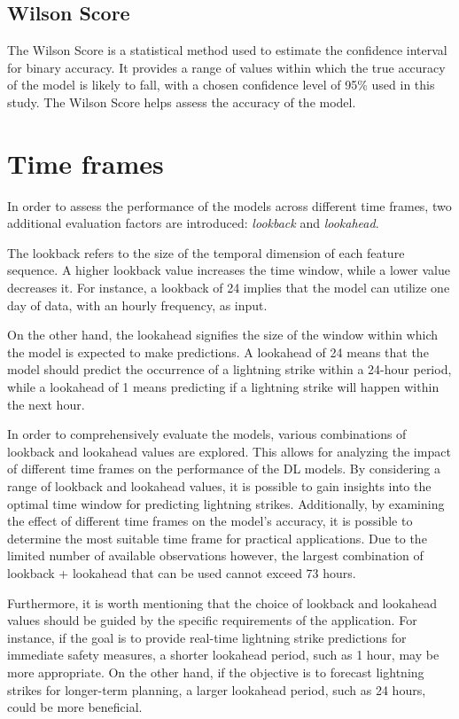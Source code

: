 \subsection{Wilson Score}

The Wilson Score is a statistical method used to estimate the confidence interval for binary accuracy. It provides a range of values within which the true accuracy of the model is likely to fall, with a chosen confidence level of 95\% used in this study. The Wilson Score helps assess the accuracy of the model.

\section{Time frames}

In order to assess the performance of the models across different time frames, two additional evaluation factors are introduced: \textit{lookback} and \textit{lookahead}.

The lookback refers to the size of the temporal dimension of each feature sequence. A higher lookback value increases the time window, while a lower value decreases it. For instance, a lookback of 24 implies that the model can utilize one day of data, with an hourly frequency, as input. 

On the other hand, the lookahead signifies the size of the window within which the model is expected to make predictions. A lookahead of 24 means that the model should predict the occurrence of a lightning strike within a 24-hour period, while a lookahead of 1 means predicting if a lightning strike will happen within the next hour.

In order to comprehensively evaluate the models, various combinations of lookback and lookahead values are explored. This allows for analyzing the impact of different time frames on the performance of the DL models. By considering a range of lookback and lookahead values, it is possible to gain insights into the optimal time window for predicting lightning strikes. Additionally, by examining the effect of different time frames on the model's accuracy, it is possible to determine the most suitable time frame for practical applications. Due to the limited number of available observations however, the largest combination of lookback + lookahead that can be used cannot exceed 73 hours.

Furthermore, it is worth mentioning that the choice of lookback and lookahead values should be guided by the specific requirements of the application. For instance, if the goal is to provide real-time lightning strike predictions for immediate safety measures, a shorter lookahead period, such as 1 hour, may be more appropriate. On the other hand, if the objective is to forecast lightning strikes for longer-term planning, a larger lookahead period, such as 24 hours, could be more beneficial.

